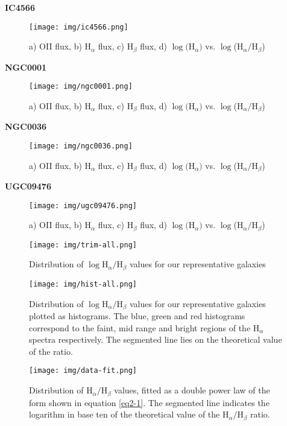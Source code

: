 \centering\textbf{IC4566}
\begin{figure}[h!]
  \centering
  \texttt{[image: img/ic4566.png]}
  \caption{a) OII flux, b) H$_{\alpha}$ flux, c) H$_{\beta}$ flux, d) $\log($H$_{\alpha})$ vs. $\log$(H$_{\alpha}/$H$_{\beta}$)}
  \label{4-1}
\end{figure}

\newpage
\textbf{NGC0001}

\begin{figure}[h!]
  \centering
  \texttt{[image: img/ngc0001.png]}
  \caption{a) OII flux, b) H$_{\alpha}$ flux, c) H$_{\beta}$ flux, d) $\log($H$_{\alpha})$ vs. $\log$(H$_{\alpha}/$H$_{\beta}$)}
  \label{4-2}
\end{figure}
\textbf{NGC0036}
\begin{figure}[h!]
  \centering
  \texttt{[image: img/ngc0036.png]}
  \caption{a) OII flux, b) H$_{\alpha}$ flux, c) H$_{\beta}$ flux, d) $\log($H$_{\alpha})$ vs. $\log$(H$_{\alpha}/$H$_{\beta}$)}
  \label{4-3}
\end{figure}

\textbf{UGC09476}
\begin{figure}[h!]
  \centering
  \texttt{[image: img/ugc09476.png]}
  \caption{a) OII flux, b) H$_{\alpha}$ flux, c) H$_{\beta}$ flux, d) $\log($H$_{\alpha})$ vs. $\log$(H$_{\alpha}/$H$_{\beta}$)}
  \label{4-4}
\end{figure}


\begin{figure}[h]
  \centering
  \texttt{[image: img/trim-all.png]}
  \caption{Distribution of $\log$H$_{\alpha}/$H$_{\beta}$ values for our representative galaxies}
  \label{4-5}
\end{figure}

\begin{figure}[h]
  \centering
  \texttt{[image: img/hist-all.png]}
  \caption{Distribution of $\log$H$_{\alpha}/$H$_{\beta}$ values for our representative galaxies plotted as
  histograms. The blue, green and red histograms correspond to the faint, mid range and bright regions of the H$_{\alpha}$ spectra
  respectively. The segmented line lies on the theoretical value of the ratio.}
  \label{4-6}
\end{figure}

\clearpage
\begin{figure}[h]
  \centering
  \texttt{[image: img/data-fit.png]}
  \caption{Distribution of H$_{\alpha}/$H$_{\beta}$ values, fitted as a double power law of the form shown in equation \ref{eq2-1}.
   The segmented line indicates the logarithm in base ten of the theoretical value of the H$_{\alpha}/$H$_{\beta}$ ratio.}
  \label{4-7}
\end{figure}

